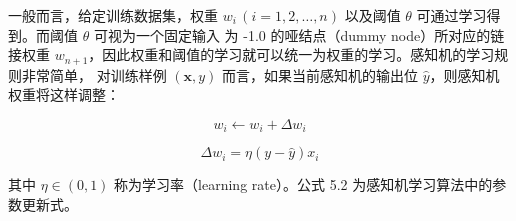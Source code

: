 \documentclass[../studies-ml.tex]{subfiles}
\begin{document}
一般而言，给定训练数据集，权重 $w_i\, (i=1,2,\dots,n)$ 以及阈值 $\theta$ 可通过学习得到。而阈值 $\theta$ 可视为一个固定输入
为 -1.0 的哑结点（dummy node）所对应的链接权重 $w_{n+1}$，因此权重和阈值的学习就可以统一为权重的学习。感知机的学习规则非常简单，
对训练样例 $(\pmb{x},y)$ 而言，如果当前感知机的输出位 $\hat{y}$，则感知机权重将这样调整：

\begin{equation}
  w_i \leftarrow w_i + \Delta w_i
\end{equation}

\begin{equation}
  \Delta w_i = \eta (y - \hat{y}) x_i
\end{equation}

其中 $\eta \in (0,1)$ 称为学习率（learning rate）。公式 5.2 为感知机学习算法中的参数更新式。

\newpage
\end{document}
